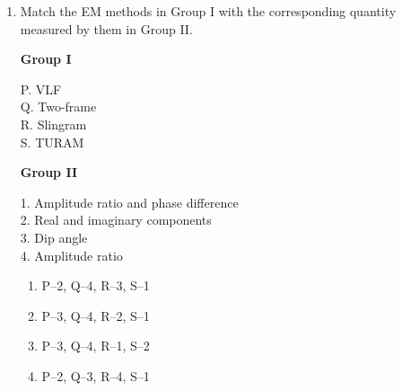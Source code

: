 \documentclass[journal,12pt,onecolumn]{IEEEtran}
\theoremstyle{remark}
\begin{document}
\begin{enumerate}
\item Match the EM methods in Group I with the corresponding quantity measured by them in Group II.

\begin{multicols}{2}
\textbf{Group I}  
\begin{flushleft}
P. VLF\\
Q. Two-frame\\
R. Slingram\\
S. TURAM
\end{flushleft}

\columnbreak

\textbf{Group II}  
\begin{flushleft}
1. Amplitude ratio and phase difference\\
2. Real and imaginary components\\
3. Dip angle\\
4. Amplitude ratio
\end{flushleft}
\end{multicols}

\begin{multicols}{2}
\begin{enumerate}
\item P--2, Q--4, R--3, S--1  
\item P--3, Q--4, R--2, S--1  
\item P--3, Q--4, R--1, S--2  
\item P--2, Q--3, R--4, S--1  
\end{enumerate}
\end{multicols}

\end{enumerate}
\end{document}
